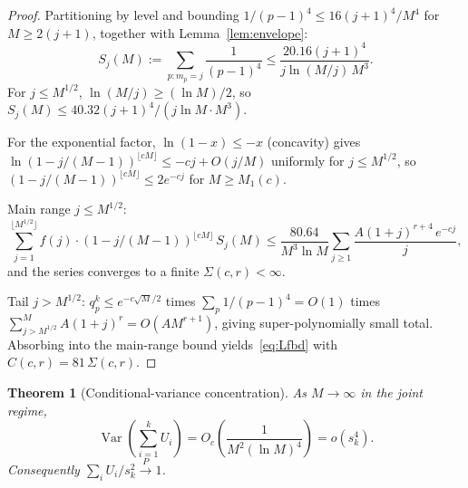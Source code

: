 \documentclass[11pt]{article}
\newtheorem{theorem}{Theorem}
\theoremstyle{remark}
\DeclareMathOperator{\Var}{Var}
\begin{document}
\begin{proof}
Partitioning by level and bounding $1/(p - 1)^4 \leq 16(j + 1)^4/M^4$ for $M \geq 2(j + 1)$, together with Lemma~\ref{lem:envelope}:
\[
S_j(M) := \sum_{p \colon m_p = j} \frac{1}{(p-1)^4} \leq \frac{20.16 (j+1)^4}{j \ln(M/j)\, M^3}.
\]
For $j \leq M^{1/2}$, $\ln(M/j) \geq (\ln M)/2$, so $S_j(M) \leq 40.32 (j+1)^4/(j \ln M \cdot M^3)$.

For the exponential factor, $\ln(1 - x) \leq -x$ (concavity) gives $\ln(1 - j/(M-1))^{\lfloor cM \rfloor} \leq -cj + O(j/M)$ uniformly for $j \leq M^{1/2}$, so $(1 - j/(M-1))^{\lfloor cM \rfloor} \leq 2 e^{-cj}$ for $M \geq M_1(c)$.

Main range $j \leq M^{1/2}$:
\[
\sum_{j=1}^{\lfloor M^{1/2} \rfloor} f(j) \cdot (1 - j/(M-1))^{\lfloor cM \rfloor}\, S_j(M) \leq \frac{80.64}{M^3 \ln M} \sum_{j \geq 1} \frac{A (1 + j)^{r+4}\, e^{-cj}}{j},
\]
and the series converges to a finite $\Sigma(c, r) < \infty$.

Tail $j > M^{1/2}$: $q_p^k \leq e^{-c \sqrt{M}/2}$ times $\sum_p 1/(p-1)^4 = O(1)$ times $\sum_{j > M^{1/2}}^{M} A(1 + j)^r = O(A M^{r+1})$, giving super-polynomially small total. Absorbing into the main-range bound yields~\eqref{eq:Lfbd} with $C(c, r) = 81\, \Sigma(c, r)$.
\end{proof}

\begin{theorem}[Conditional-variance concentration]\label{thm:HH1}
As $M \to \infty$ in the joint regime,
\[
\Var\!\left(\sum_{i=1}^k U_i\right)
= O_c\!\left(\frac{1}{M^2(\ln M)^4}\right)
= o(s_k^4).
\]
Consequently $\sum_i U_i/s_k^2 \xrightarrow{P} 1$.
\end{theorem}
\end{document}
